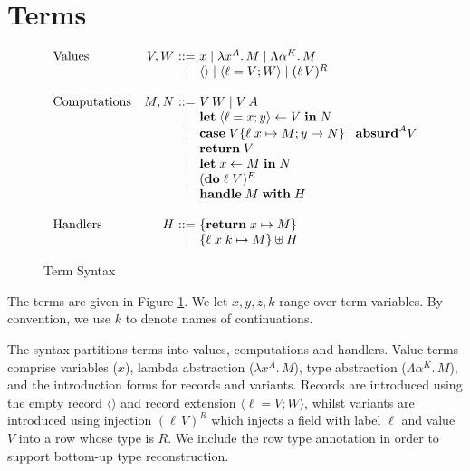 \documentclass[mscres,icsa,lfcs,twoside,openright,logo,rightchapter,normalheadings]{infthesis}
\makeatletter
\theoremstyle{definition}
\newcommand{\slab}[1]{\textrm{#1}}
\newcommand{\revto}{\ensuremath{\leftarrow}}
\newcommand{\keyw}[1]{\textbf{#1}}
\newcommand{\Handle}{\keyw{handle}}
\newcommand{\With}{\keyw{with}}
\newcommand{\Let}{\keyw{let}}
\newcommand{\In}{\keyw{in}}
\newcommand{\Do}{\keyw{do}}
\newcommand{\Return}{\keyw{return}}
\newcommand{\Case}{\keyw{case}}
\newcommand{\Absurd}{\keyw{absurd}}
\newcommand{\Record}[1]{\ensuremath{\langle #1 \rangle}}
\newcommand{\True}{\mathsf{true}}
\newcommand{\False}{\mathsf{false}}
\newcommand{\ba}{\begin{array}}
\newcommand{\ea}{\end{array}}
\newenvironment{syntax}{\[\ba{@{}l@{\quad}r@{~}c@{~}l@{}}}{\ea\]\ignorespacesafterend}
\makeatother
\begin{document}
\section{Terms}
\begin{figure}
\begin{syntax}
\slab{Values}        &V,W  &::= & x
                             \mid \lambda x^A .\, M \mid \Lambda \alpha^K .\, M  \\
                     &     &\mid& \Record{} \mid \Record{\ell = V;W} \mid (\ell\, V)^R \\
                     &     &    &\\
\slab{Computations}  &M,N  &::= & V\,W \mid V\,A\\
                     &     &\mid& \Let\; \Record{\ell=x;y} \revto V \; \In \; N\\
                     &     &\mid& \Case\; V \{\ell\; x \mapsto M; y \mapsto N\} \mid \Absurd^A V\\
                     &     &\mid& \Return\; V \\
                     &     &\mid& \Let \; x \revto M \; \In \; N\\
                     &     &\mid& (\Do \; \ell \; V)^E \\
                     &     &\mid& \Handle \; M \; \With \; H\\
                     &     &    &\\
\slab{Handlers}      &H    &::= & \{ \Return \; x \mapsto M \} \\
                     &     &\mid& \{ \ell \; x \; k \mapsto M \} \uplus H \\
\end{syntax}

\caption{Term Syntax}
\label{fig:term-syntax}
\end{figure}
The terms are given in Figure \ref{fig:term-syntax}. We let $x,y,z,k$
range over term variables. By convention, we use $k$ to denote names
of continuations. %

The syntax partitions terms into values, computations and
handlers. 
%
Value terms comprise variables ($x$), %
lambda abstraction ($\lambda x^A . \, M$), type abstraction ($\Lambda
\alpha^K . \, M$), and the introduction forms for records and
variants. Records are introduced using the empty record $\Record{}$
and record extension $\Record{\ell = V; W}$, whilst variants are
introduced using injection $(\ell\, V)^R$ which injects a field with
label $\ell$ and value $V$ into a row whose type is $R$. We include
the row type annotation in order to support bottom-up type
reconstruction.
\end{document}
